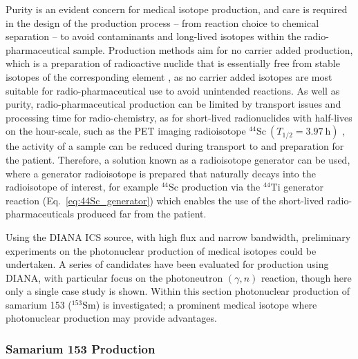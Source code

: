 \documentclass[../main.tex]{subfiles}
\begin{document}
Purity is an evident concern for medical isotope production, and care is required in the design of the production process -- from reaction choice to chemical separation -- to avoid contaminants and long-lived isotopes within the radio-pharmaceutical sample. Production methods aim for no carrier added production, which is a preparation of radioactive nuclide that is essentially free from stable isotopes of the corresponding element \cite{currie1994nomenclature,wolf1981synthesis,coenen2017consensus}, as no carrier added isotopes are most suitable for radio-pharmaceutical use to avoid unintended reactions. As well as purity, radio-pharmaceutical production can be limited by transport issues and processing time for radio-chemistry, as for short-lived radionuclides with half-lives on the hour-scale, such as the PET imaging radioisotope $^{44}\mathrm{Sc}~\left(T_{1/2}=3.97~\si{\hour}\right)$ \cite{roesch2012scandium,muller2014promising}, the activity of a sample can be reduced during transport to and preparation for the patient. Therefore, a solution known as a radioisotope generator can be used, where a generator radioisotope is prepared that naturally decays into the radioisotope of interest, for example $^{44}\mathrm{Sc}$ production via the $^{44}\mathrm{Ti}$ generator reaction (Eq.~\ref{eq:44Sc_generator}) \cite{roesch2012scandium,muller2014promising} which enables the use of the short-lived radio-pharmaceuticals produced far from the patient.

Using the DIANA ICS source, with high flux and narrow bandwidth, preliminary experiments on the photonuclear production of medical isotopes could be undertaken. A series of candidates have been evaluated for production using DIANA, with particular focus on the photoneutron $\left(\gamma,n\right)$ reaction, though here only a single case study is shown. Within this section photonuclear production of samarium 153 ($^{153}\mathrm{Sm}$) is investigated; a prominent medical isotope where photonuclear production may provide advantages.  

\subsubsection{Samarium 153 Production}
\end{document}
